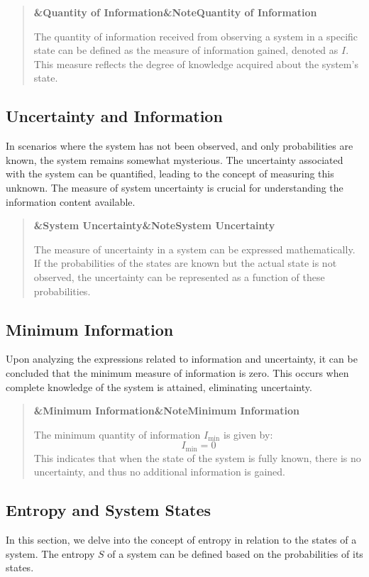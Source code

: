 \documentclass[a4paper]{article}
\newcommand{\boxheading}[1]{%
  \par\smallskip
  \noindent\textbf{\ifx&#1&Note\else#1\fi}\par
  \smallskip
}
\newenvironment{thmbox}[1][]{%
  \begin{quote}\color{blue!60!black}\boxheading{#1}\normalcolor
}{\end{quote}}
\newenvironment{defbox}[1][]{%
  \begin{quote}\color{green!40!black}\boxheading{#1}\normalcolor
}{\end{quote}}
\newenvironment{rembox}[1][]{%
  \begin{quote}\color{black!70}\boxheading{#1}\normalcolor
}{\end{quote}}
\begin{document}
\begin{defbox}[Quantity of Information]
The quantity of information received from observing a system in a specific state can be defined as the measure of information gained, denoted as \( I \). This measure reflects the degree of knowledge acquired about the system's state.
\end{defbox}

\subsection{Uncertainty and Information}
In scenarios where the system has not been observed, and only probabilities are known, the system remains somewhat mysterious. The uncertainty associated with the system can be quantified, leading to the concept of measuring this unknown. The measure of system uncertainty is crucial for understanding the information content available.

\begin{rembox}[System Uncertainty]
The measure of uncertainty in a system can be expressed mathematically. If the probabilities of the states are known but the actual state is not observed, the uncertainty can be represented as a function of these probabilities.
\end{rembox}

\subsection{Minimum Information}
Upon analyzing the expressions related to information and uncertainty, it can be concluded that the minimum measure of information is zero. This occurs when complete knowledge of the system is attained, eliminating uncertainty.

\begin{thmbox}[Minimum Information]
The minimum quantity of information \( I_{\text{min}} \) is given by:
\begin{equation}
I_{\text{min}} = 0
\end{equation}
This indicates that when the state of the system is fully known, there is no uncertainty, and thus no additional information is gained.
\end{thmbox}

\subsection{Entropy and System States}
In this section, we delve into the concept of entropy in relation to the states of a system. The entropy \( S \) of a system can be defined based on the probabilities of its states. 
\end{document}
